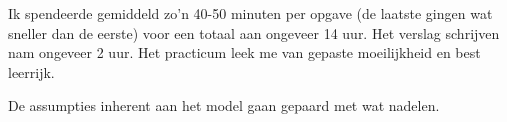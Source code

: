 
Ik spendeerde gemiddeld zo'n 40-50 minuten per opgave (de laatste gingen wat sneller dan de eerste) voor een totaal aan ongeveer 14 uur. Het verslag schrijven nam ongeveer 2 uur. Het practicum leek me van gepaste moeilijkheid en best leerrijk.\\

\par\noindent De assumpties inherent aan het model gaan gepaard met wat nadelen.